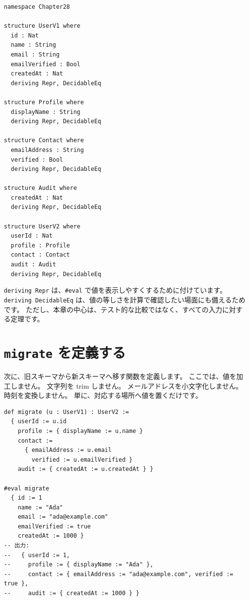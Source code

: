 \begin{listing}[htbp]
\begin{verbatim}
namespace Chapter28

structure UserV1 where
  id : Nat
  name : String
  email : String
  emailVerified : Bool
  createdAt : Nat
  deriving Repr, DecidableEq

structure Profile where
  displayName : String
  deriving Repr, DecidableEq

structure Contact where
  emailAddress : String
  verified : Bool
  deriving Repr, DecidableEq

structure Audit where
  createdAt : Nat
  deriving Repr, DecidableEq

structure UserV2 where
  userId : Nat
  profile : Profile
  contact : Contact
  audit : Audit
  deriving Repr, DecidableEq
\end{verbatim}
\caption{\texttt{UserV1} と \texttt{UserV2}}
\label{lst:ch28-schema-defs}
\end{listing}

\texttt{deriving Repr} は、\texttt{\#eval} で値を表示しやすくするために付けています。
\texttt{deriving DecidableEq} は、値の等しさを計算で確認したい場面にも備えるためです。
ただし、本章の中心は、テスト的な比較ではなく、すべての入力に対する定理です。

\section{\texttt{migrate} を定義する}

次に、旧スキーマから新スキーマへ移す関数を定義します。
ここでは、値を加工しません。
文字列を trim しません。
メールアドレスを小文字化しません。
時刻を変換しません。
単に、対応する場所へ値を置くだけです。

\begin{listing}[htbp]
\begin{verbatim}
def migrate (u : UserV1) : UserV2 :=
  { userId := u.id
    profile := { displayName := u.name }
    contact :=
      { emailAddress := u.email
        verified := u.emailVerified }
    audit := { createdAt := u.createdAt } }

#eval migrate
  { id := 1
    name := "Ada"
    email := "ada@example.com"
    emailVerified := true
    createdAt := 1000 }
-- 出力:
--   { userId := 1,
--     profile := { displayName := "Ada" },
--     contact := { emailAddress := "ada@example.com", verified := true },
--     audit := { createdAt := 1000 } }
\end{verbatim}
\caption{\texttt{migrate}}
\label{lst:ch28-migrate}
\end{listing}

